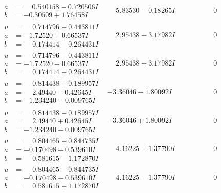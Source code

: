 \documentclass[1p]{elsarticle_modified}
\theoremstyle{definition}
\begin{document}
$$\begin{array}{c|c|c}
\begin{aligned}
a &= \phantom{-}0.540158 - 0.720506 I \\
b &= -0.30509 + 1.76458 I\end{aligned}
 & \phantom{-}5.83530 - 0.18265 I & \phantom{-0.000000 } 0 \\ \hline\begin{aligned}
u &= \phantom{-}0.714796 + 0.443811 I \\
a &= -1.72520 + 0.66537 I \\
b &= \phantom{-}0.174414 - 0.264431 I\end{aligned}
 & \phantom{-}2.95438 - 3.17982 I & \phantom{-0.000000 } 0 \\ \hline\begin{aligned}
u &= \phantom{-}0.714796 - 0.443811 I \\
a &= -1.72520 - 0.66537 I \\
b &= \phantom{-}0.174414 + 0.264431 I\end{aligned}
 & \phantom{-}2.95438 + 3.17982 I & \phantom{-0.000000 } 0 \\ \hline\begin{aligned}
u &= \phantom{-}0.814438 + 0.189957 I \\
a &= \phantom{-}2.49440 - 0.42645 I \\
b &= -1.234240 + 0.009765 I\end{aligned}
 & -3.36046 - 1.80092 I & \phantom{-0.000000 } 0 \\ \hline\begin{aligned}
u &= \phantom{-}0.814438 - 0.189957 I \\
a &= \phantom{-}2.49440 + 0.42645 I \\
b &= -1.234240 - 0.009765 I\end{aligned}
 & -3.36046 + 1.80092 I & \phantom{-0.000000 } 0 \\ \hline\begin{aligned}
u &= \phantom{-}0.804465 + 0.844735 I \\
a &= -0.170498 + 0.539610 I \\
b &= \phantom{-}0.581615 - 1.172870 I\end{aligned}
 & \phantom{-}4.16225 + 1.37790 I & \phantom{-0.000000 } 0 \\ \hline\begin{aligned}
u &= \phantom{-}0.804465 - 0.844735 I \\
a &= -0.170498 - 0.539610 I \\
b &= \phantom{-}0.581615 + 1.172870 I\end{aligned}
 & \phantom{-}4.16225 - 1.37790 I & \phantom{-0.000000 } 0\\

\end{array}$$
\end{document}
